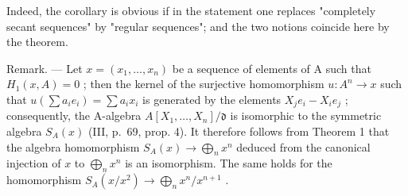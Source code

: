 Indeed, the corollary is obvious if in the statement one replaces "completely secant sequences" by "regular sequences"; and the two notions coincide here by the theorem.

Remark. --- Let \(x = (x_1, \ldots, x_n)\) be a sequence of elements of A such that \(H_1(x, A) = 0\) ; then the kernel of the surjective homomorphism \(u: A^n \to x\) such that \(u(\sum a_i e_i) = \sum a_i x_i\) is generated by the elements \(X_j e_i - X_i e_j\) ; consequently, the A-algebra \(A[X_1, \ldots, X_n] / \mathfrak{d}\) is isomorphic to the symmetric algebra \(S_A(x)\) (III, p.~69, prop. 4). It therefore follows from Theorem 1 that the algebra homomorphism \(S_A(x) \to \bigoplus_n x^n\) deduced from the canonical injection of \(x\) to \(\bigoplus_n x^n\) is an isomorphism. The same holds for the homomorphism \(S_A(x / x^2) \to \bigoplus_n x^n / x^{n+1}\) .


